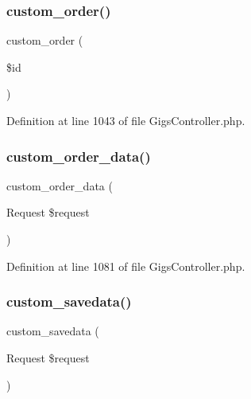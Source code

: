 \subsubsection{\texorpdfstring{custom\_order()}{custom\_order()}}
{\footnotesize\ttfamily custom\+\_\+order (\begin{DoxyParamCaption}\item[{}]{\$id }\end{DoxyParamCaption})}



Definition at line 1043 of file Gigs\+Controller.\+php.

\mbox{\label{class_responsive_1_1_http_1_1_controllers_1_1_gigs_controller_a1e523a1a30c0216f457be90c4e6ae19f}} 
\subsubsection{\texorpdfstring{custom\_order\_data()}{custom\_order\_data()}}
{\footnotesize\ttfamily custom\+\_\+order\+\_\+data (\begin{DoxyParamCaption}\item[{Request}]{\$request }\end{DoxyParamCaption})\hspace{0.3cm}{\ttfamily [protected]}}



Definition at line 1081 of file Gigs\+Controller.\+php.

\mbox{\label{class_responsive_1_1_http_1_1_controllers_1_1_gigs_controller_ac3a5f5a889fdb8bb9858fb102b403927}} 
\subsubsection{\texorpdfstring{custom\_savedata()}{custom\_savedata()}}
{\footnotesize\ttfamily custom\+\_\+savedata (\begin{DoxyParamCaption}\item[{Request}]{\$request }\end{DoxyParamCaption})\hspace{0.3cm}{\ttfamily [protected]}}



